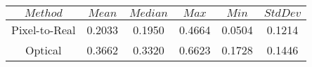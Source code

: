 \begin{table}[h]
\centering
\begin{tabular}{|c|c|c|c|c|c|}
\hline
$Method$ & $Mean$ & $Median$ & $Max$ & $Min$ & $StdDev$ \\
\hline
Pixel-to-Real & 0.2033 & 0.1950 & 0.4664 & 0.0504 & 0.1214 \\
\hline
Optical & 0.3662 & 0.3320 & 0.6623 & 0.1728 & 0.1446 \\
\hline
\end{tabular}
\end{table}

